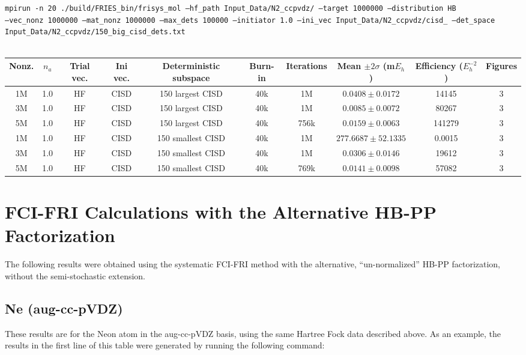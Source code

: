 \documentclass[12pt, landscape]{article}
\begin{document}
\texttt{mpirun -n 20 ./build/FRIES\_bin/frisys\_mol --hf\_path Input\_Data/N2\_ccpvdz/ --target 1000000 --distribution HB}\\ \texttt{--vec\_nonz 1000000 --mat\_nonz 1000000 --max\_dets 100000 --initiator 1.0 --ini\_vec Input\_Data/N2\_ccpvdz/cisd\_ --det\_space Input\_Data/N2\_ccpvdz/150\_big\_cisd\_dets.txt}
\\~\\
\begin{tabular}{c|c|c|c|c|c|c|c|c|c}
Nonz. & $n_a$ & Trial vec. & Ini vec. & Deterministic subspace & Burn-in & Iterations & Mean $\pm 2 \sigma$ (m$E_h$) & Efficiency ($E_h^{-2}$) & Figures \\ \hline
1M & 1.0 & HF & CISD & 150 largest CISD & 40k & 1M & $0.0408 \pm 0.0172$ & 14145 & 3 \\
3M & 1.0 & HF & CISD & 150 largest CISD & 40k & 1M & $0.0085 \pm 0.0072$ & 80267 & 3 \\
5M & 1.0 & HF & CISD & 150 largest CISD & 40k & 756k & $0.0159 \pm 0.0063$ & 141279 & 3 \\
1M & 1.0 & HF & CISD & 150 smallest CISD & 40k & 1M & $277.6687 \pm 52.1335$ & 0.0015 & 3 \\
3M & 1.0 & HF & CISD & 150 smallest CISD & 40k & 1M & $0.0306 \pm 0.0146$ & 19612 & 3 \\
5M & 1.0 & HF & CISD & 150 smallest CISD & 40k & 769k & $0.0141 \pm 0.0098$ & 57082 & 3 \\
\end{tabular}

\section*{FCI-FRI Calculations with the Alternative HB-PP Factorization}

The following results were obtained using the systematic FCI-FRI method with the alternative, ``un-normalized'' HB-PP factorization, without the semi-stochastic extension.

\subsection*{Ne (aug-cc-pVDZ)}
These results are for the Neon atom in the aug-cc-pVDZ basis, using the same Hartree Fock data described above. As an example, the results in the first line of this table were generated by running the following command:
\end{document}
